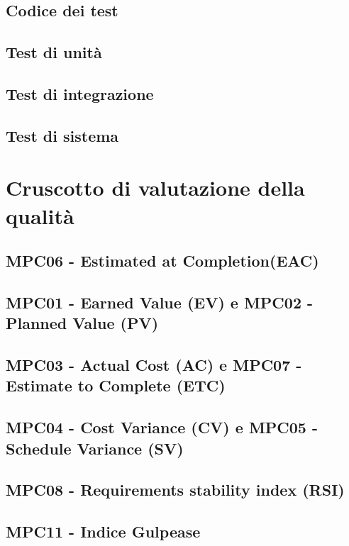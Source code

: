 \documentclass[italian,12pt]{article} %
\begin{document}
\subsection{Codice dei test}

\subsection{Test di unità}

\subsection{Test di integrazione}

\subsection{Test di sistema}

\section{Cruscotto di valutazione della qualità}

\subsection{MPC06 - Estimated at Completion(EAC)}

\subsection{MPC01 - Earned Value (EV) e MPC02 - Planned Value (PV)}

\subsection{MPC03 - Actual Cost (AC) e MPC07 - Estimate to Complete (ETC)}

\subsection{MPC04 - Cost Variance (CV) e MPC05 - Schedule Variance (SV)}

\subsection{MPC08 - Requirements stability index (RSI)}

\subsection{MPC11 - Indice Gulpease}
\end{document}
